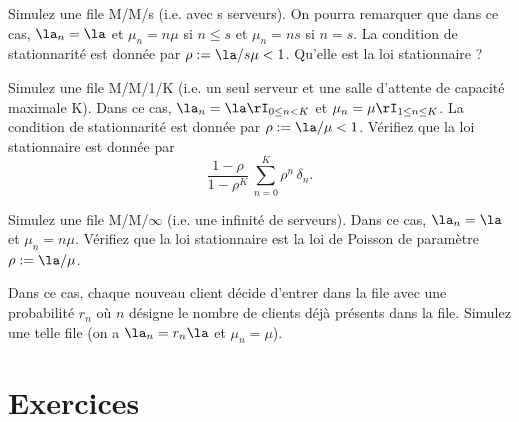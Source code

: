 {{\begin{exo}
  Simulez une file M/M/s (i.e. avec s serveurs).  On pourra remarquer
  que dans ce cas, $\la_n=\la$ et $\mu_n=n\mu$ si $n\leq s$ et
  $\mu_n=ns$ si $n=s$.  La condition de stationnarité est donnée par
  $\rho:=\la/s\mu<1$. Qu'elle est la loi stationnaire ?
\end{exo}

\begin{exo}
  Simulez une file M/M/1/K (i.e. un seul serveur et une salle
  d'attente de capacité maximale K).  Dans ce cas, $\la_n=\la
  \rI_{0\leq n < K}$ et $\mu_n=\mu \rI_{1\leq n \leq K}$.  La
  condition de stationnarité est donnée par $\rho:=\la/\mu<1$.
  Vérifiez que la loi stationnaire est donnée par
  $$
  \frac{1-\rho}{1-\rho^{K}}\,\sum_{n=0}^K \rho^n\,\delta_n.
  $$
\end{exo}

\begin{exo}
  Simulez une file M/M/$\infty$ (i.e. une infinité de serveurs).  Dans
  ce cas, $\la_n=\la$ et $\mu_n=n\mu$.  Vérifiez que la loi
  stationnaire est la loi de Poisson de paramètre $\rho:=\la/\mu$.
\end{exo}

\begin{exo}
  Dans ce cas, chaque nouveau client décide d'entrer dans la file avec
  une probabilité $r_n$ où $n$ désigne le nombre de clients déjà
  présents dans la file. Simulez une telle file (on a $\la_n=r_n\la$
  et $\mu_n=\mu$).
\end{exo}

%
\section{Exercices}
%

}}
